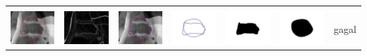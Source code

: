 \begin{table}[H]
\begin{tabular}{|m{0.7in}|m{0.7in}|m{0.7in}|m{0.7in}|m{0.7in}|m{0.7in}|m{0.7in}|}
		&  &  & & & &  \\
		\includegraphics[width=0.7in]{dataset/dataset_3/luka_merah/ready/12_interp_init.jpg}&
		\includegraphics[width=0.7in]{dataset/dataset_3/luka_merah/ready/12_interp_ext.jpg}&
		\includegraphics[width=0.7in]{dataset/dataset_3/luka_merah/ready/12_interp_result.jpg}&
		\includegraphics[width=0.7in]{dataset/dataset_3/luka_merah/ready/12_gt_r.jpg}&
		\includegraphics[width=0.7in]{dataset/dataset_3/luka_merah/ready/12_r.jpg}&
		\includegraphics[width=0.7in]{dataset/dataset_3/luka_merah/ready/12_interp_r.jpg}&
		gagal\\
		\hline
		

\end{tabular}
\end{table}
